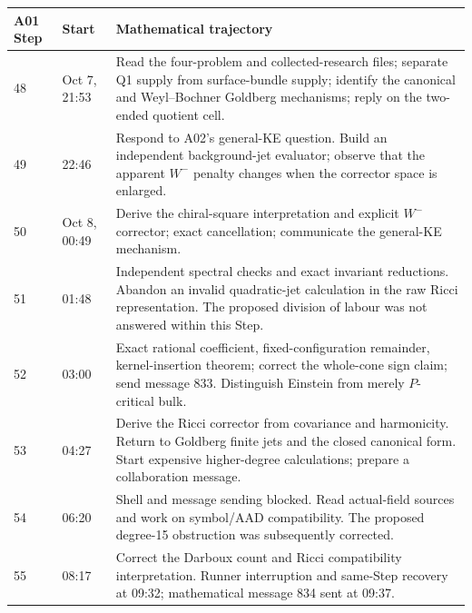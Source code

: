 \documentclass[11pt]{article}
\theoremstyle{remark}
\begin{document}
\begin{longtable}{@{}p{}p{}p{}@{}}
\toprule A01 Step & Start & Mathematical trajectory\\\midrule\endhead
48 & Oct 7, 21:53 & Read the four-problem and collected-research files;
separate Q1 supply from surface-bundle supply; identify the canonical and
Weyl--Bochner Goldberg mechanisms; reply on the two-ended quotient cell.\\
49 & 22:46 & Respond to A02's general-KE question. Build an independent
background-jet evaluator; observe that the apparent $W^-$ penalty changes
when the corrector space is enlarged.\\
50 & Oct 8, 00:49 & Derive the chiral-square interpretation and explicit
$W^-$ corrector; exact cancellation; communicate the general-KE mechanism.\\
51 & 01:48 & Independent spectral checks and exact invariant reductions.
Abandon an invalid quadratic-jet calculation in the raw Ricci representation.
The proposed division of labour was not answered within this Step.\\
52 & 03:00 & Exact rational coefficient, fixed-configuration remainder,
kernel-insertion theorem; correct the whole-cone sign claim; send message
833. Distinguish Einstein from merely $P$-critical bulk.\\
53 & 04:27 & Derive the Ricci corrector from covariance and harmonicity.
Return to Goldberg finite jets and the closed canonical form. Start expensive
higher-degree calculations; prepare a collaboration message.\\
54 & 06:20 & Shell and message sending blocked. Read actual-field sources
and work on symbol/AAD compatibility. The proposed degree-15 obstruction
was subsequently corrected.\\
55 & 08:17 & Correct the Darboux count and Ricci compatibility interpretation.
Runner interruption and same-Step recovery at 09:32; mathematical message
834 sent at 09:37.\\
\bottomrule
\end{longtable}
\end{document}
